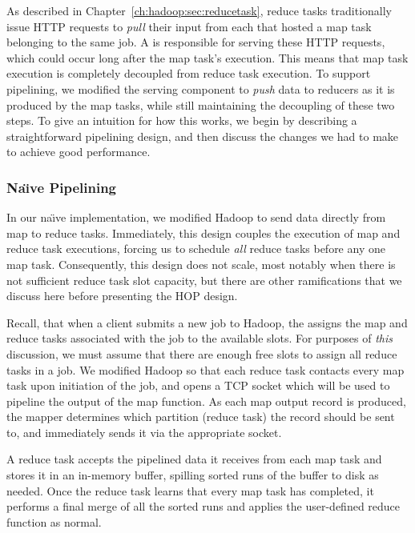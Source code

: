 As described in Chapter~\ref{ch:hadoop:sec:reducetask}, reduce tasks
traditionally issue HTTP requests to {\em pull} their input from each {\TT}
that hosted a map task belonging to the same job.  A \TT is responsible for
serving these HTTP requests, which could occur long after the map task's
execution.  This means that map task execution is completely decoupled from
reduce task execution.  To support pipelining, we modified the \TT serving
component to {\em push} data to reducers as it is produced by the map tasks,
while still maintaining the decoupling of these two steps.  To give an
intuition for how this works, we begin by describing a straightforward
pipelining design, and then discuss the changes we had to make to achieve good
performance.

\subsubsection{Na\"{\i}ve Pipelining}
\label{ch:hop:sec:naive}

In our na\"{\i}ve implementation, we modified Hadoop to send data directly from
map to reduce tasks.  Immediately, this design couples the execution of map and
reduce task executions, forcing us to schedule {\em all} reduce tasks before
any one map task.  Consequently, this design does not scale, most notably when
there is not sufficient reduce task slot capacity, but there are other
ramifications that we discuss here before presenting the HOP design.

Recall, that when a client submits a new job to Hadoop, the {\JT} assigns the
map and reduce tasks associated with the job to the available {\TT} slots.  For
purposes of {\em this} discussion, we must assume that there are enough free
slots to assign all reduce tasks in a job.  We modified Hadoop so that each
reduce task contacts every map task upon initiation of the job, and opens a TCP
socket which will be used to pipeline the output of the map function.  As each
map output record is produced, the mapper determines which partition (reduce
task) the record should be sent to, and immediately sends it via the
appropriate socket.

A reduce task accepts the pipelined data it receives from each map task and
stores it in an in-memory buffer, spilling sorted runs of the buffer to disk as
needed. Once the reduce task learns that every map task has completed, it
performs a final merge of all the sorted runs and applies the user-defined
reduce function as normal.

